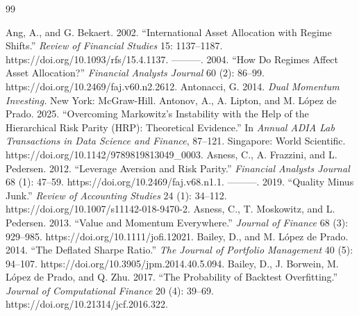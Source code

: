 \documentclass[12pt,letterpaper]{article}
\begin{document}
%
\begin{thebibliography}{99}
\setlength{\itemsep}{2pt}
\setlength{\parskip}{0pt}

 Ang, A., and G. Bekaert. 2002. ``International Asset Allocation with Regime Shifts.'' \emph{Review of Financial Studies} 15: 1137–1187. https://doi.org/10.1093/rfs/15.4.1137.
 ---------. 2004. ``How Do Regimes Affect Asset Allocation?'' \emph{Financial Analysts Journal} 60 (2): 86–99. https://doi.org/10.2469/faj.v60.n2.2612.
 Antonacci, G. 2014. \emph{Dual Momentum Investing.} New York: McGraw-Hill.
 Antonov, A., A. Lipton, and M. L\'opez de Prado. 2025. ``Overcoming Markowitz's Instability with the Help of the Hierarchical Risk Parity (HRP): Theoretical Evidence.'' In \emph{Annual ADIA Lab Transactions in Data Science and Finance}, 87–121. Singapore: World Scientific. https://doi.org/10.1142/9789819813049\_0003.
 Asness, C., A. Frazzini, and L. Pedersen. 2012. ``Leverage Aversion and Risk Parity.'' \emph{Financial Analysts Journal} 68 (1): 47–59. https://doi.org/10.2469/faj.v68.n1.1.
 ---------. 2019. ``Quality Minus Junk.'' \emph{Review of Accounting Studies} 24 (1): 34–112. https://doi.org/10.1007/s11142-018-9470-2.
 Asness, C., T. Moskowitz, and L. Pedersen. 2013. ``Value and Momentum Everywhere.'' \emph{Journal of Finance} 68 (3): 929–985. https://doi.org/10.1111/jofi.12021.
 Bailey, D., and M. L\'opez de Prado. 2014. ``The Deflated Sharpe Ratio.'' \emph{The Journal of Portfolio Management} 40 (5): 94–107. https://doi.org/10.3905/jpm.2014.40.5.094.
 Bailey, D., J. Borwein, M. L\'opez de Prado, and Q. Zhu. 2017. ``The Probability of Backtest Overfitting.'' \emph{Journal of Computational Finance} 20 (4): 39–69. https://doi.org/10.21314/jcf.2016.322.

\end{thebibliography}
\end{document}
